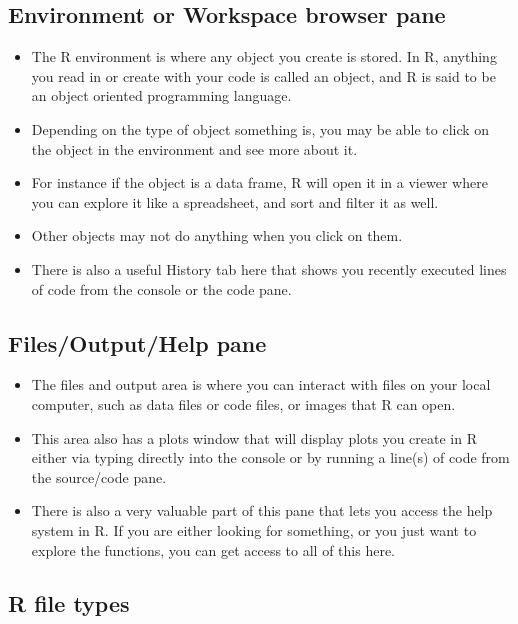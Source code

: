 \documentclass[
  letterpaper,
  DIV=11,
  numbers=noendperiod]{scrreprt}
\begin{document}
\hypertarget{environment-or-workspace-browser-pane}{%
\subsection{Environment or Workspace browser
pane}\label{environment-or-workspace-browser-pane}}

\begin{itemize}
\item
  The R environment is where any object you create is stored. In R,
  anything you read in or create with your code is called an object, and
  R is said to be an object oriented programming language.
\item
  Depending on the type of object something is, you may be able to click
  on the object in the environment and see more about it.
\item
  For instance if the object is a data frame, R will open it in a viewer
  where you can explore it like a spreadsheet, and sort and filter it as
  well.
\item
  Other objects may not do anything when you click on them.
\item
  There is also a useful History tab here that shows you recently
  executed lines of code from the console or the code pane.
\end{itemize}

\hypertarget{filesoutputhelp-pane}{%
\subsection{Files/Output/Help pane}\label{filesoutputhelp-pane}}

\begin{itemize}
\item
  The files and output area is where you can interact with files on your
  local computer, such as data files or code files, or images that R can
  open.
\item
  This area also has a plots window that will display plots you create
  in R either via typing directly into the console or by running a
  line(s) of code from the source/code pane.
\item
  There is also a very valuable part of this pane that lets you access
  the help system in R. If you are either looking for something, or you
  just want to explore the functions, you can get access to all of this
  here.
\end{itemize}

\hypertarget{r-file-types}{%
\subsection{R file types}\label{r-file-types}}
\end{document}
